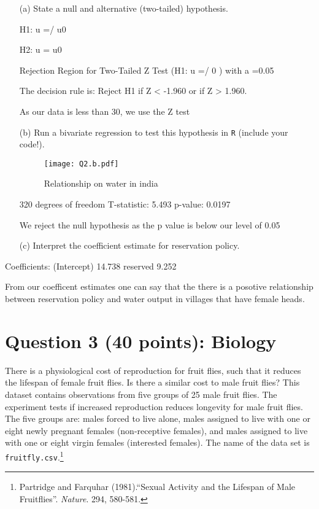 \documentclass[12pt,letterpaper]{article}
\begin{document}
\newpage
\begin{enumerate}
	\item [(a)] State a null and alternative (two-tailed) hypothesis. 

H1: u =/ u0

H2: u = u0



Rejection Region for Two-Tailed Z Test (H1: u =/ 0 ) with a =0.05

The decision rule is: Reject H1 if Z < -1.960 or if Z > 1.960.

As our data is less than 30, we use the Z test 	
	\vspace{6cm}
	\item [(b)] Run a bivariate regression to test this hypothesis in \texttt{R} (include your code!).
\begin{figure}[htbp]
	\centerline{\texttt{[image: Q2.b.pdf]}}
	\caption{Relationship on water in india}
	\label{fig}
\end{figure}



320 degrees of freedom
T-statistic: 5.493 
p-value: 0.0197

We reject the null hypothesis as the p value is below our level of 0.05	
	\vspace{6cm}
	\item [(c)] Interpret the coefficient estimate for reservation policy. 
\end{enumerate}



Coefficients:
(Intercept) 14.738    
reserved  9.252 

From our coefficent estimates one can say that the there is a posotive relationship between reservation policy and water output in villages that have female heads. 

\newpage
	\section*{Question 3 (40 points): Biology}

There is a physiological cost of reproduction for fruit flies, such that it reduces the lifespan of female fruit flies.  Is there a similar cost to male fruit flies?  This dataset contains observations from five groups of 25 male fruit flies. The experiment tests if increased reproduction reduces longevity for male fruit flies. The five groups are: males forced to live alone, males assigned to live with one or eight newly pregnant females (non-receptive females), and males assigned to live with one or eight virgin females (interested females). The name of the data set is \texttt{fruitfly.csv}.\footnote{Partridge and Farquhar (1981).``Sexual Activity and the Lifespan of Male Fruitflies''. \textit{Nature}. 294, 580-581.}
	\vspace{1cm}
\end{document}
